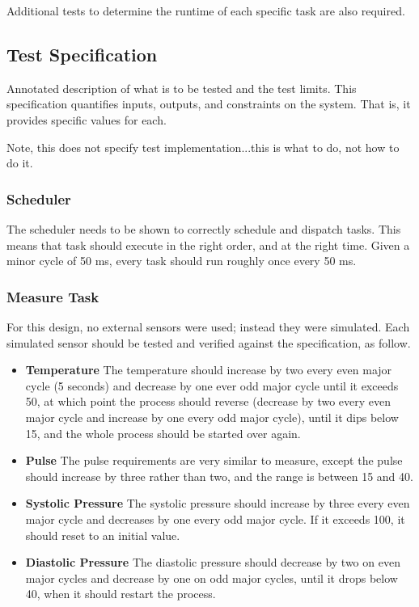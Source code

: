 \documentclass[12pt]{article} %
\begin{document}
Additional tests to determine the runtime of each specific task are also required.

\subsection{Test Specification}

Annotated description of what is to be tested and the test limits.  This specification quantifies inputs, outputs, and constraints on the system.  That is, it provides specific values for each. 

Note, this does not specify test implementation...this is what to do, not how to do it.

\subsubsection{Scheduler}
The scheduler needs to be shown to correctly schedule and dispatch tasks.  This means that task should execute in the right order, and at the right time.  Given a minor cycle of 50 ms, every task should run roughly once every 50 ms.  

\subsubsection{Measure Task}
For this design, no external sensors were used; instead they were simulated.  Each simulated sensor should be tested and verified against the specification, as follow.
\begin{itemize}
  \item \textbf{Temperature} The temperature should increase by two every even major cycle (5 seconds) and decrease by one ever odd major cycle until it exceeds 50, at which point the process should reverse (decrease by two every even major cycle and increase by one every odd major cycle), until it dips below 15, and the whole process should be started over again.  
  \item \textbf{Pulse} The pulse requirements are very similar to measure, except the pulse should increase by three rather than two, and the range is between 15 and 40.
  \item \textbf{Systolic Pressure} The systolic pressure should increase by three every even major cycle and decreases by one every odd major cycle.  If it exceeds 100, it should reset to an initial value.
  \item \textbf{Diastolic Pressure} The diastolic pressure should decrease by two on even major cycles and decrease by one on odd major cycles, until it drops below 40, when it should restart the process.
\end{itemize}
\end{document}
